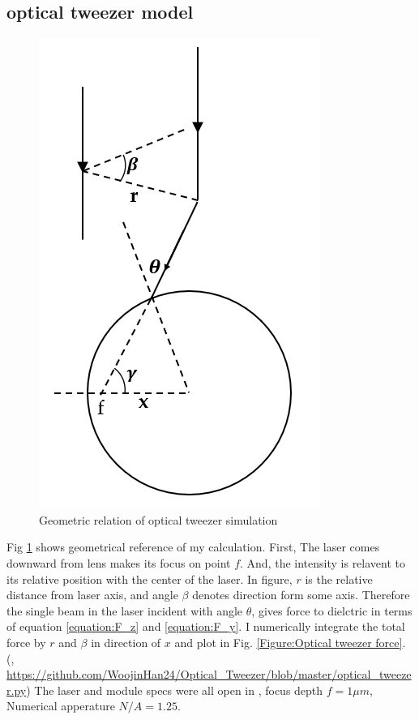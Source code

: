 \documentclass{article}
\begin{document}
\subsection{optical tweezer model}
\label{discussion:optical_tweezer_simulation}
\begin{figure}[h]
    \centering
    \includegraphics[width=0.3\linewidth]{../results/Optical_tweezer_simulation_fig.png}
    \caption{Geometric relation of optical tweezer simulation}
    \label{Figure:optical tweezer simulation_fig}
\end{figure}
Fig \ref{Figure:optical tweezer simulation_fig} shows geometrical reference of my calculation.
First, The laser comes downward from lens makes its focus on point $f$.
And, the intensity is relavent to its relative position with the center of the laser.
In figure, $r$ is the relative distance from laser axis, and angle $\beta$ denotes direction form some axis.
Therefore the single beam in the laser incident with angle $\theta$, gives force to dielctric in terms of equation \ref{equation:F_z} and \ref{equation:F_y}.
I numerically integrate the total force by $r$ and $\beta$ in direction of $x$ and plot in Fig. \ref{Figure:Optical tweezer force}.
(\cite{single_beam}, \url{https://github.com/WoojinHan24/Optical_Tweezer/blob/master/optical_tweezer.py})
The laser and module specs were all open in \cite{opticaltweezermodule}, focus depth $f= 1 \mu m$, Numerical apperature $N/A =1.25$.
\end{document}
